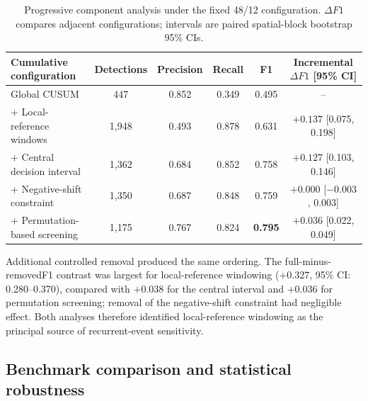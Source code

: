 \begin{table}[pos=!htbp]
    \centering
    \small
    \caption{Progressive component analysis under the fixed 48/12 configuration. $\Delta F1$ compares adjacent configurations; intervals are paired spatial-block bootstrap 95\% CIs.}
    \label{tab:component_ablation}
    \begin{tabular}{lccccc}
        \toprule
        Cumulative configuration
        & Detections
        & Precision
        & Recall
        & F1
        & Incremental $\Delta F1$ [95\% CI] \\
        \midrule

        Global CUSUM
        & 447
        & 0.852
        & 0.349
        & 0.495
        & -- \\

        + Local-reference windows
        & 1,948
        & 0.493
        & 0.878
        & 0.631
        & $+0.137$ [0.075, 0.198] \\

        + Central decision interval
        & 1,362
        & 0.684
        & 0.852
        & 0.758
        & $+0.127$ [0.103, 0.146] \\

        + Negative-shift constraint
        & 1,350
        & 0.687
        & 0.848
        & 0.759
        & $+0.000$ [$-0.003$, 0.003] \\

        + Permutation-based screening
        & 1,175
        & 0.767
        & 0.824
        & \textbf{0.795}
        & $+0.036$ [0.022, 0.049] \\

        \bottomrule
    \end{tabular}
\end{table}


Additional controlled removal produced the same ordering. The full-minus-removedF1 contrast was largest for local-reference windowing ($+0.327$, 95\% CI: 0.280--0.370), compared with $+0.038$ for the central interval and $+0.036$ for permutation screening; removal of the negative-shift constraint had negligible effect. Both analyses therefore identified local-reference windowing as the principal source of recurrent-event sensitivity.


\FloatBarrier


\subsection{Benchmark comparison and statistical robustness}
\label{sec:benchmark_null_sensitivity}

